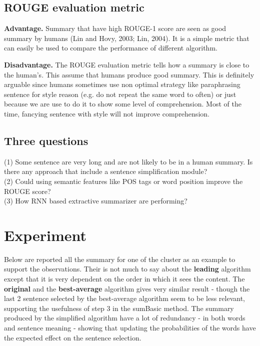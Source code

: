 \documentclass[10pt]{article}
\begin{document}
\subsection{ROUGE evaluation metric}
\textbf{Advantage.} Summary that have high ROUGE-1 score are seen as good summary by humans (Lin and Hovy, 2003; Lin, 2004). It is a simple metric that can easily be used to compare the performance of different algorithm. 

\textbf{Disadvantage.} The ROUGE evaluation metric tells how a summary is close to the human's. This assume that humans produce good summary. This is definitely arguable since humans sometimes use non optimal strategy like paraphrasing sentence for style reason (e.g. do not repeat the same word to often) or just because we are use to do it to show some level of comprehension. Most of the time, fancying sentence with style will not improve comprehension.

\subsection{Three questions}
(1) Some sentence are very long and are not likely to be in a human summary. Is there any approach that include a sentence simplification module?\\

(2) Could using semantic features like POS tags or word position improve the ROUGE score?\\

(3) How RNN based extractive summarizer are performing?

\section{Experiment}
Below are reported all the summary for one of the cluster as an example to support the observations. Their is not much to say about the \textbf{leading} algorithm except that it is very dependent on the order in which it sees the content. The \textbf{original} and the \textbf{best-average} algorithm gives very similar result - though the last 2 sentence selected by the best-average algorithm seem to be less relevant, supporting the usefulness of step 3 in the sumBasic method. The summary produced by the simplified algorithm have a lot of redundancy - in both words and sentence meaning - showing that updating the probabilities of the words have the expected effect on the sentence selection. \\
\end{document}
